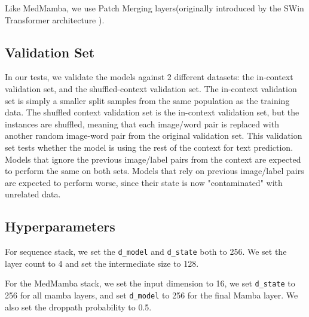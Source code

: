 Like MedMamba, we use Patch Merging layers(originally introduced by the SWin
Transformer architecture \cite{swintrans}).

\subsection{Validation Set}
In our tests, we validate the models against 2 different datasets: the
in-context validation set, and the shuffled-context validation set.
The in-context validation set is simply a smaller split samples from the same
population as the training data.
The shuffled context validation set is the in-context validation set, but the
instances are shuffled, meaning that each image/word pair is replaced with
another random image-word pair from the original validation set.
This validation set tests whether the model is using the rest of the context for
text prediction.
Models that ignore the previous image/label pairs from the context are expected
to perform the same on both sets.
Models that rely on previous image/label pairs are expected to perform worse,
since their state is now "contaminated" with unrelated data.

\subsection{Hyperparameters}
For sequence stack, we set the \verb|d_model| and \verb|d_state| both to 256.
We set the layer count to 4 and set the intermediate size to 128.

For the MedMamba stack, we set the input dimension to 16, we set \verb|d_state|
to 256 for all mamba layers, and set \verb|d_model| to 256 for the final Mamba
layer.
We also set the droppath probability to 0.5.
